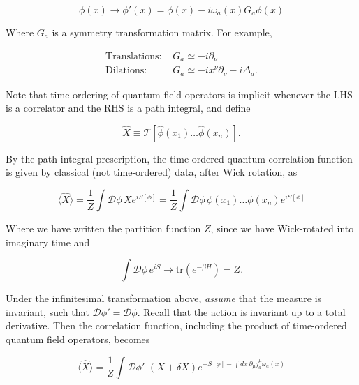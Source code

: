 \begin{equation}
\phi(x) \rightarrow \phi' (x) = \phi (x) - i \omega_a (x) G_a \phi (x)
\end{equation}

\noindent Where $G_a$ is a symmetry transformation matrix. For example,

\begin{align}
\text{Translations: }& G_a \simeq -i \partial_\nu \\
\text{Dilations: }& G_a \simeq -i x^\nu \partial_\nu - i \Delta_a.
\end{align}

\noindent Note that time-ordering of quantum field operators is implicit whenever the LHS is a correlator and the RHS is a path integral, and define 

\begin{equation}
\hat{X} \equiv \mathcal{T} [ \hat{\phi} (x_1) \dots \hat{\phi} (x_n) ].
\end{equation}

\noindent By the path integral prescription, the time-ordered quantum correlation function is given by classical (not time-ordered) data, after Wick rotation, as

\begin{equation}
\langle \hat{X} \rangle = \frac{1}{Z} \int \mathcal{D} \phi \, X e^{iS[\phi]} = \frac{1}{Z} \int \mathcal{D} \phi \, \phi (x_1) \dots \phi (x_n) e^{iS[\phi]}
\end{equation}

\noindent Where we have written the partition function $Z$, since we have Wick-rotated into imaginary time and

\begin{equation}
\int \mathcal{D} \phi \, e^{iS} \rightarrow \text{tr}(e^{-\beta H}) = Z.
\end{equation}

\noindent Under the infinitesimal transformation above, \textit{assume} that the measure is invariant, such that $\mathcal{D} \phi' = \mathcal{D} \phi$. Recall that the action is invariant up to a total derivative. Then the correlation function, including the product of time-ordered quantum field operators, becomes

\begin{equation}
\langle \hat{X} \rangle = \frac{1}{Z} \int \mathcal{D} \phi' \,\, (X + \delta X) e^{-S[\phi] - \int dx \, \partial_\mu j_a^\mu \omega_a (x)}
\end{equation}

